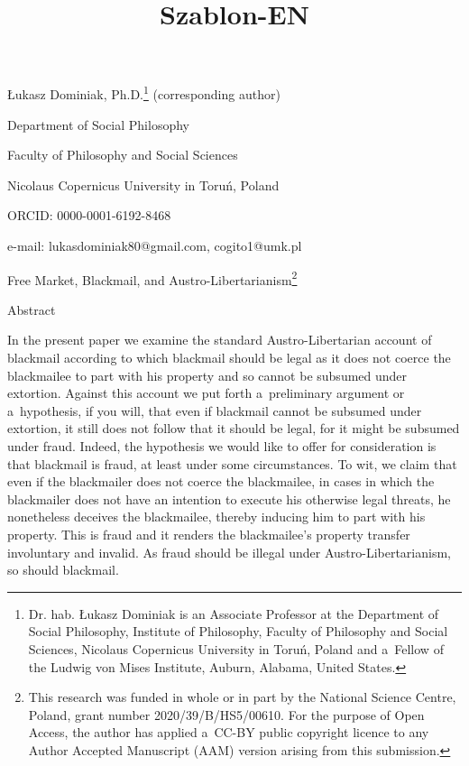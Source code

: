 \setcounter{secnumdepth}{1}


















\title{Szablon-EN}



Łukasz Dominiak, Ph.D.\footnote{Dr. hab. Łukasz Dominiak is an Associate Professor at the Department of Social Philosophy, Institute of Philosophy, Faculty of Philosophy and Social Sciences, Nicolaus Copernicus University in Toruń, Poland and a~Fellow of the Ludwig von Mises Institute, Auburn, Alabama, United States.} (corresponding author)



Department of Social Philosophy



Faculty of Philosophy and Social Sciences



Nicolaus Copernicus University in Toruń, Poland



ORCID: 0000-0001-6192-8468



e-mail: lukasdominiak80@gmail.com, cogito1@umk.pl



Free Market, Blackmail, and Austro-Libertarianism\footnote{This research was funded in whole or in part by the National Science Centre, Poland, grant number 2020/39/B/HS5/00610. For the purpose of Open Access, the author has applied a~CC-BY public copyright licence to any Author Accepted Manuscript (AAM) version arising from this submission.}





Abstract



In the present paper we examine the standard Austro-Libertarian account of blackmail according to which blackmail should be legal as it does not coerce the blackmailee to part with his property and so cannot be subsumed under extortion. Against this account we put forth a~preliminary argument or a~hypothesis, if you will, that even if blackmail cannot be subsumed under extortion, it still does not follow that it should be legal, for it might be subsumed under fraud. Indeed, the hypothesis we would like to offer for consideration is that blackmail is fraud, at least under some circumstances. To wit, we claim that even if the blackmailer does not coerce the blackmailee, in cases in which the blackmailer does not have an intention to execute his otherwise legal threats, he nonetheless deceives the blackmailee, thereby inducing him to part with his property. This is fraud and it renders the blackmailee's property transfer involuntary and invalid. As fraud should be illegal under Austro-Libertarianism, so should blackmail.



